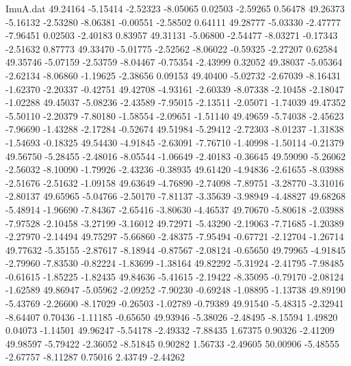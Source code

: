\begin{filecontents}{ImuA.dat}
  49.24164   -5.15414   -2.52323   -8.05065    0.02503   -2.59265    0.56478
  49.26373   -5.16132   -2.53280   -8.06381   -0.00551   -2.58502    0.64111
  49.28777   -5.03330   -2.47777   -7.96451    0.02503   -2.40183    0.83957
  49.31131   -5.06800   -2.54477   -8.03271   -0.17343   -2.51632    0.87773
  49.33470   -5.01775   -2.52562   -8.06022   -0.59325   -2.27207    0.62584
  49.35746   -5.07159   -2.53759   -8.04467   -0.75354   -2.43999    0.32052
  49.38037   -5.05364   -2.62134   -8.06860   -1.19625   -2.38656    0.09153
  49.40400   -5.02732   -2.67039   -8.16431   -1.62370   -2.20337   -0.42751
  49.42708   -4.93161   -2.60339   -8.07338   -2.10458   -2.18047   -1.02288
  49.45037   -5.08236   -2.43589   -7.95015   -2.13511   -2.05071   -1.74039
  49.47352   -5.50110   -2.20379   -7.80180   -1.58554   -2.09651   -1.51140
  49.49659   -5.74038   -2.45623   -7.96690   -1.43288   -2.17284   -0.52674
  49.51984   -5.29412   -2.72303   -8.01237   -1.31838   -1.54693   -0.18325
  49.54430   -4.91845   -2.63091   -7.76710   -1.40998   -1.50114   -0.21379
  49.56750   -5.28455   -2.48016   -8.05544   -1.06649   -2.40183   -0.36645
  49.59090   -5.26062   -2.56032   -8.10090   -1.79926   -2.43236   -0.38935
  49.61420   -4.94836   -2.61655   -8.03988   -2.51676   -2.51632   -1.09158
  49.63649   -4.76890   -2.74098   -7.89751   -3.28770   -3.31016   -2.80137
  49.65965   -5.04766   -2.50170   -7.81137   -3.35639   -3.98949   -4.48827
  49.68268   -5.48914   -1.96690   -7.84367   -2.65416   -3.80630   -4.46537
  49.70670   -5.80618   -2.03988   -7.97528   -2.10458   -3.27199   -3.16012
  49.72971   -5.43290   -2.19063   -7.71685   -1.20389   -2.27970   -2.14494
  49.75297   -5.66860   -2.48375   -7.95494   -0.67721   -2.12704   -1.26714
  49.77632   -5.35155   -2.87617   -8.18944   -0.87567   -2.08124   -0.65650
  49.79965   -4.91845   -2.79960   -7.83530   -0.82224   -1.83699   -1.38164
  49.82292   -5.31924   -2.41795   -7.98485   -0.61615   -1.85225   -1.82435
  49.84636   -5.41615   -2.19422   -8.35095   -0.79170   -2.08124   -1.62589
  49.86947   -5.05962   -2.09252   -7.90230   -0.69248   -1.08895   -1.13738
  49.89190   -5.43769   -2.26600   -8.17029   -0.26503   -1.02789   -0.79389
  49.91540   -5.48315   -2.32941   -8.64407    0.70436   -1.11185   -0.65650
  49.93946   -5.38026   -2.48495   -8.15594    1.49820    0.04073   -1.14501
  49.96247   -5.54178   -2.49332   -7.88435    1.67375    0.90326   -2.41209
  49.98597   -5.79422   -2.36052   -8.51845    0.90282    1.56733   -2.49605
  50.00906   -5.48555   -2.67757   -8.11287    0.75016    2.43749   -2.44262

\end{filecontents}
